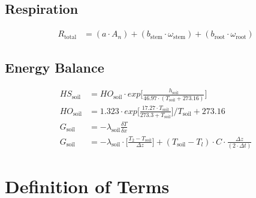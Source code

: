 \documentclass[24pt]{report}
\begin{document}
\subsection*{Respiration}
\begin{align}
 R_{\text{total}} &= (a \cdot A_n) + (b_{\text{stem}} \cdot \omega_{\text{stem}}) + (b_{\text{root}} \cdot \omega_{\text{root}}) \label{eqn:Rtotal} 
\end{align}


\subsection*{Energy Balance}
\begin{align}
 HS_{\text{soil}} &= HO_{\text{soil}} \cdot exp\biggl[\frac{h_{\text{soil}}}{46.97 \cdot (T_\text{soil} + 273.16)}\biggr] \label{eqn:HSsoil} \\
 HO_{\text{soil}} &= 1.323 \cdot exp\biggl[\frac{17.27 \cdot T_\text{soil}}{273.3 + T_\text{soil}}\biggr]\Bigg/ T_\text{soil} + 273.16 \label{eqn:HOsoil} \\
 G_{\text{soil}} &= -\lambda_{\text{soil}} \frac{\delta T}{\delta x} \label{eqn:Gsoil} \\
 G_{\text{soil}} &= -\lambda_{\text{soil}} \cdot \biggl[\frac{T_2 - T_\text{soil}}{\Delta z}\biggr] + (T_\text{soil} - T_l) \cdot C \cdot \frac{\Delta z}{(2 \cdot \Delta t)} \label{eqn:Gsoil2} 
\end{align}

\newpage

\section*{Definition of Terms } 
\end{document}
